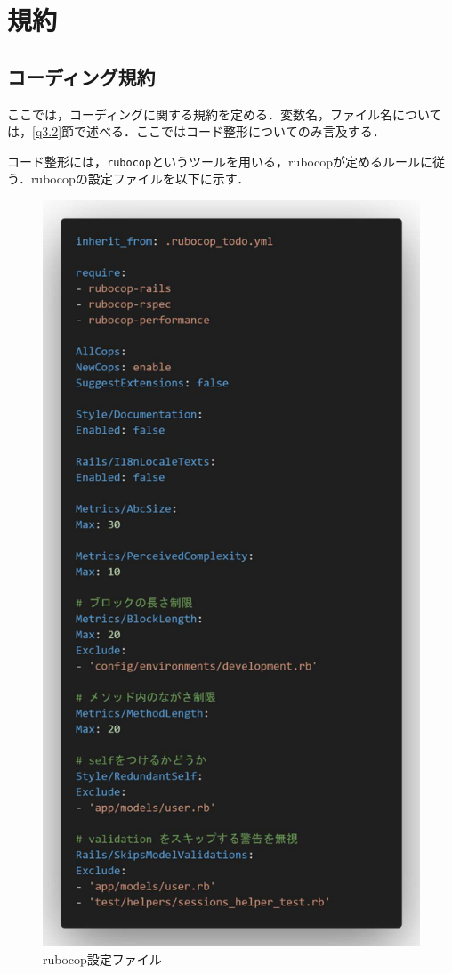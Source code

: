 \chapter{規約}
\section{コーディング規約}\label{q3.1}
ここでは，コーディングに関する規約を定める．変数名，ファイル名については，\ref{q3.2}節で述べる．ここではコード整形についてのみ言及する．

コード整形には，\texttt{rubocop}というツールを用いる，rubocopが定めるルールに従う．rubocopの設定ファイルを以下に示す．

\begin{figure}[htbp]
	\centering
	\includegraphics[scale=0.4]{img/etc/rubocop.pdf}
	\caption{rubocop設定ファイル}
	\label{rubocop}
\end{figure}


